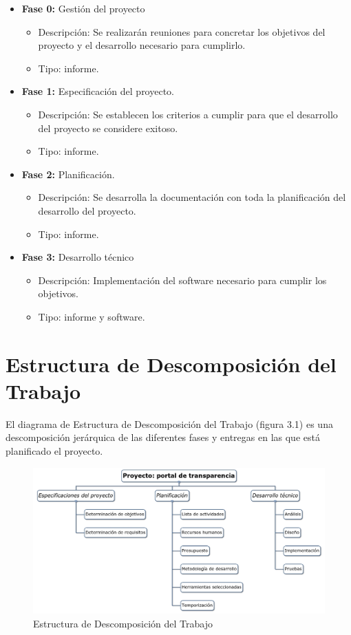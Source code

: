 \begin{itemize}
  \item \textbf{Fase 0:} Gestión del proyecto
  \begin{itemize}
    \item Descripción: Se realizarán reuniones para concretar los objetivos del proyecto y el desarrollo necesario para 
    cumplirlo.
    \item Tipo: informe.
  \end{itemize}
  \item \textbf{Fase 1:} Especificación del proyecto.
  \begin{itemize}
    \item Descripción: Se establecen los criterios a cumplir para que el desarrollo del proyecto se considere exitoso.
    \item Tipo: informe.
  \end{itemize}
  \item \textbf{Fase 2:} Planificación.
  \begin{itemize}
    \item Descripción: Se desarrolla la documentación con toda la planificación del desarrollo del proyecto.
    \item Tipo: informe.
  \end{itemize}
  \item \textbf{Fase 3:} Desarrollo técnico
  \begin{itemize}
    \item Descripción: Implementación del software necesario para cumplir los objetivos.
    \item Tipo: informe y software.
  \end{itemize}
\end{itemize}

\section{Estructura de Descomposición del Trabajo}

El diagrama de Estructura de Descomposición del Trabajo (figura 3.1) es una descomposición jerárquica de las diferentes fases y 
entregas en las que está planificado el proyecto.

\begin{figure}[htb]
  \begin{center}
  \includegraphics[width=1\textwidth]{imagenes/edt.png}
  \end{center}
  \caption[EDT]{Estructura de Descomposición del Trabajo}
\end{figure}

